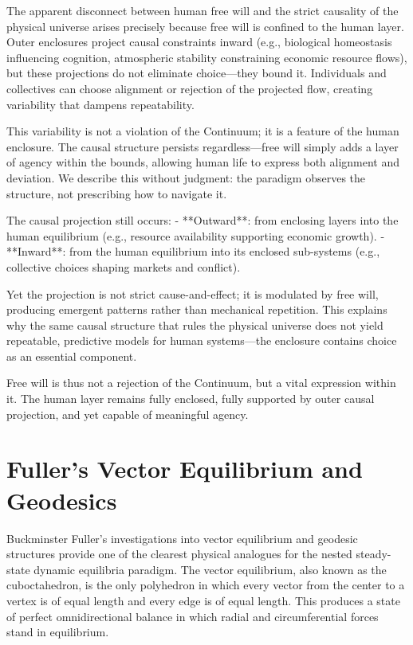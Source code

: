 The apparent disconnect between human free will and the strict causality of the physical universe arises precisely because free will is confined to the human layer. Outer enclosures project causal constraints inward (e.g., biological homeostasis influencing cognition, atmospheric stability constraining economic resource flows), but these projections do not eliminate choice—they bound it. Individuals and collectives can choose alignment or rejection of the projected flow, creating variability that dampens repeatability.

This variability is not a violation of the Continuum; it is a feature of the human enclosure. The causal structure persists regardless—free will simply adds a layer of agency within the bounds, allowing human life to express both alignment and deviation. We describe this without judgment: the paradigm observes the structure, not prescribing how to navigate it.

The causal projection still occurs:
- **Outward**: from enclosing layers into the human equilibrium (e.g., resource availability supporting economic growth).
- **Inward**: from the human equilibrium into its enclosed sub-systems (e.g., collective choices shaping markets and conflict).

Yet the projection is not strict cause-and-effect; it is modulated by free will, producing emergent patterns rather than mechanical repetition. This explains why the same causal structure that rules the physical universe does not yield repeatable, predictive models for human systems—the enclosure contains choice as an essential component.

Free will is thus not a rejection of the Continuum, but a vital expression within it. The human layer remains fully enclosed, fully supported by outer causal projection, and yet capable of meaningful agency.

\chapter{Fuller's Vector Equilibrium and Geodesics}

Buckminster Fuller’s investigations into vector equilibrium and geodesic structures provide one of the clearest physical analogues for the nested steady-state dynamic equilibria paradigm. The vector equilibrium, also known as the cuboctahedron, is the only polyhedron in which every vector from the center to a vertex is of equal length and every edge is of equal length. This produces a state of perfect omnidirectional balance in which radial and circumferential forces stand in equilibrium.

